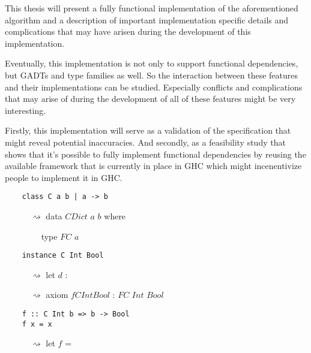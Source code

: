This thesis will present a fully functional implementation of the aforementioned
algorithm and a description of important implementation specific details and
complications that may have arisen during the development of this
implementation.

Eventually, this implementation is not only to support functional dependencies,
but GADTs and type families as well. So the interaction between these features
and their implementations can be studied. Especially conflicts and complications
that may arise of during the development of all of these features might be very
interesting.

Firstly, this implementation will serve as a validation of the specification
that might reveal potential inaccuracies. And secondly, as a feasibility study
that shows that it's possible to fully implement functional dependencies by
reusing the available framework that is currently in place in GHC which might
incenentivize people to implement it in GHC.

\begin{verbatim}
    class C a b | a -> b
\end{verbatim}
$\quad\quad\quad\rightsquigarrow$ data $CDict$ $a$ $b$ where

$\quad\quad\quad\quad$ type $FC$ $a$

\begin{verbatim}
    instance C Int Bool
\end{verbatim}
$\quad\quad\quad\rightsquigarrow$ let $d$ : 

$\quad\quad\quad\rightsquigarrow$ axiom $fCIntBool$ : $FC$ $Int$ $Bool$

\begin{verbatim}
    f :: C Int b => b -> Bool
    f x = x
\end{verbatim}
$\quad\quad\quad\rightsquigarrow$ let $f$ = 
